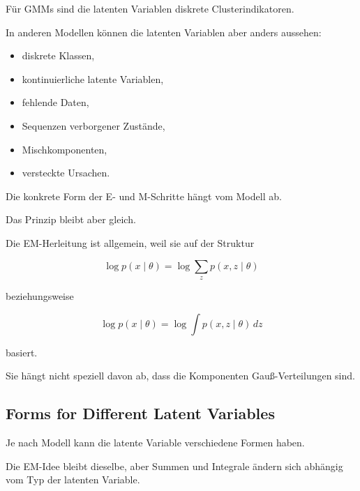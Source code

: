 \documentclass[11pt,a4paper]{scrartcl}
\begin{document}
\begin{solutionbox}
    Für GMMs sind die latenten Variablen diskrete Clusterindikatoren.

    In anderen Modellen können die latenten Variablen aber anders aussehen:

    \begin{itemize}
        \item diskrete Klassen,
        \item kontinuierliche latente Variablen,
        \item fehlende Daten,
        \item Sequenzen verborgener Zustände,
        \item Mischkomponenten,
        \item versteckte Ursachen.
    \end{itemize}

    Die konkrete Form der E- und M-Schritte hängt vom Modell ab.

    Das Prinzip bleibt aber gleich.
\end{solutionbox}

\begin{answerbox}
    Die EM-Herleitung ist allgemein, weil sie auf der Struktur

    \[
        \boxed{
            \log p(x\mid \theta)
            =
            \log \sum_z p(x,z\mid \theta)
        }
    \]

    beziehungsweise

    \[
        \boxed{
            \log p(x\mid \theta)
            =
            \log \int p(x,z\mid \theta)\,dz
        }
    \]

    basiert.

    Sie hängt nicht speziell davon ab, dass die Komponenten Gauß-Verteilungen
    sind.
\end{answerbox}

\subsection{Forms for Different Latent Variables}

\begin{notebox}
    Je nach Modell kann die latente Variable verschiedene Formen haben.

    Die EM-Idee bleibt dieselbe, aber Summen und Integrale ändern sich abhängig
    vom Typ der latenten Variable.
\end{notebox}
\end{document}
